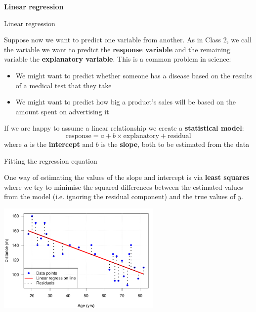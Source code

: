 \documentclass[12pt,xcolor=dvipsnames,handout,mathserif,aspectratio=169]{beamer}
\newcommand{\bbl}[1]{{\color{NavyBlue} \textbf{#1}}}
\newcommand{\bgr}[1]{{\color{PineGreen} \textbf{#1}}}
\begin{document}
\date{Lecture 6 -- Part 3}

\begin{frame}[fragile]{}
\bbl{\Huge Linear regression}\\ 
\vspace{0.5cm}
\end{frame}


\begin{frame}{Linear regression}

Suppose now we want to predict one variable from another. As in Class 2, we call the variable we want to predict the \bbl{response variable} and the remaining variable the \bgr{explanatory variable}. This is a common problem in science:
\begin{itemize}
\item We might want to predict whether someone has a disease based on the results of a medical test that they take
\item We might want to predict how big a product's sales will be based on the amount spent on advertising it
\end{itemize}
\pause
If we are happy to assume a linear relationship we create a \bgr{statistical model}:
$$\mbox{response} = a + b \times \mbox{explanatory} + \mbox{residual} $$
where $a$ is the \bbl{intercept} and $b$ is the \bgr{slope}, both to be estimated from the data
\end{frame}

\begin{frame}{Fitting the regression equation}

One way of estimating the values of the slope and intercept is via \bgr{least squares} where we try to minimise the squared differences between the estimated values from the model (i.e. ignoring the residual component) and the true values of $y$. 
\begin{center}
\includegraphics[width=0.6\textwidth]{agedistreg.pdf}
\end{center}
\end{frame}
\end{document}
